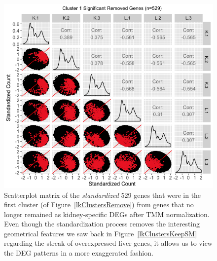 \documentclass{article}
\begin{document}
\null
\begin{figure}[t!]
\centerline{\includegraphics[width=1\columnwidth]{../MakeFigures/lkClustersRemoveSM-St.jpg}}
\caption{Scatterplot matrix of the \textit{standardized} 529 genes that were in the first cluster (of Figure~\ref{lkClustersRemove}) from genes that no longer remained as kidney-specific DEGs after TMM normalization. Even though the standardization process removes the interesting geometrical features we saw back in Figure~\ref{lkClustersKeepSM} regarding the streak of overexpressed liver genes, it allows us to view the DEG patterns in a more exaggerated fashion.
\label{lkClustersRemoveSM-St}}
\end{figure}
\end{document}
